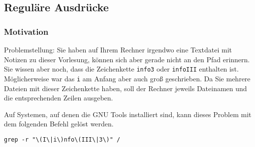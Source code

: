 {%
%

\renewcommand{\llbracket}{[\![}
\renewcommand{\rrbracket}{]\!]}

\subsection{Reguläre Ausdrücke}
\subsubsection{Motivation}
Problemstellung: Sie haben auf Ihrem Rechner irgendwo eine Textdatei mit Notizen zu dieser Vorlesung, können sich aber gerade nicht an den Pfad erinnern.
Sie wissen aber noch, dass die Zeichenkette \texttt{info3} oder \texttt{infoIII} enthalten ist. 
Möglicherweise war das \texttt{i} am Anfang aber auch groß geschrieben.
Da Sie mehrere Dateien mit dieser Zeichenkette haben, soll der Rechner jeweils Dateinamen und die entsprechenden Zeilen ausgeben.

Auf Systemen, auf denen die GNU Tools installiert sind, kann dieses Problem mit dem folgenden Befehl gelöst werden.
\begin{center}
\verb+grep -r "\(I\|i\)nfo\(III\|3\)" /+ 
\end{center}



}
